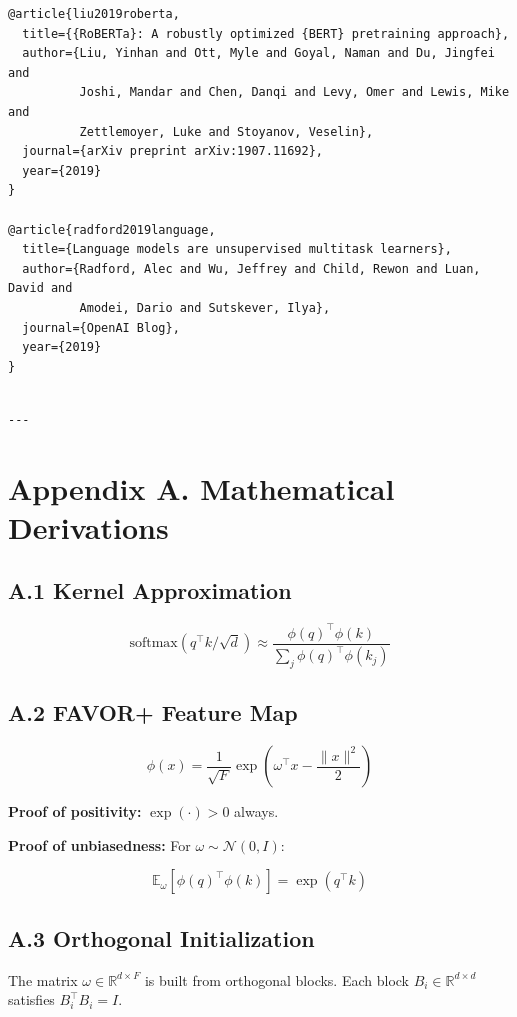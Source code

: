 \begin{lstlisting}
@article{liu2019roberta,
  title={{RoBERTa}: A robustly optimized {BERT} pretraining approach},
  author={Liu, Yinhan and Ott, Myle and Goyal, Naman and Du, Jingfei and 
          Joshi, Mandar and Chen, Danqi and Levy, Omer and Lewis, Mike and 
          Zettlemoyer, Luke and Stoyanov, Veselin},
  journal={arXiv preprint arXiv:1907.11692},
  year={2019}
}

@article{radford2019language,
  title={Language models are unsupervised multitask learners},
  author={Radford, Alec and Wu, Jeffrey and Child, Rewon and Luan, David and 
          Amodei, Dario and Sutskever, Ilya},
  journal={OpenAI Blog},
  year={2019}
}
\end{lstlisting}
\begin{lstlisting}

---
\end{lstlisting}


\section{Appendix A. Mathematical Derivations}

\subsection{A.1 Kernel Approximation}

\[
\text{softmax}(q^\top k / \sqrt{d}) \approx \frac{\phi(q)^\top \phi(k)}{\sum_j \phi(q)^\top \phi(k_j)}
\tag{A.1}
\]

\subsection{A.2 FAVOR+ Feature Map}

\[
\phi(x) = \frac{1}{\sqrt{F}} \exp\!\left(\omega^\top x - \frac{\|x\|^2}{2}\right)
\tag{A.2}
\]

\textbf{Proof of positivity:} $\exp(\cdot) > 0$ always.

\textbf{Proof of unbiasedness:} For $\omega \sim \mathcal{N}(0, I)$:

\[
\mathbb{E}_\omega[\phi(q)^\top \phi(k)] = \exp(q^\top k)
\tag{A.3}
\]

\subsection{A.3 Orthogonal Initialization}

The matrix $\omega \in \mathbb{R}^{d \times F}$ is built from orthogonal 
blocks. Each block $B_i \in \mathbb{R}^{d \times d}$ satisfies 
$B_i^\top B_i = I$.

